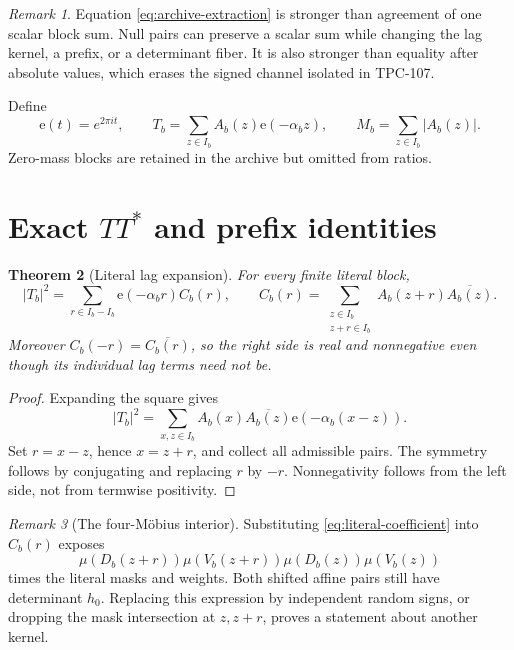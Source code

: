 \documentclass[11pt]{article}
\newtheorem{theorem}{Theorem}[section]
\theoremstyle{definition}
\theoremstyle{remark}
\newtheorem{remark}[theorem]{Remark}
\newcommand{\e}{\mathrm e}
\begin{document}
\begin{remark}
Equation \eqref{eq:archive-extraction} is stronger than agreement of
one scalar block sum.  Null pairs can preserve a scalar sum while
changing the lag kernel, a prefix, or a determinant fiber.  It is
also stronger than equality after absolute values, which erases the
signed channel isolated in TPC-107.
\end{remark}

Define
\[
 \e(t)=e^{2\pi it},\qquad
 T_b=\sum_{z\in I_b}A_b(z)\e(-\alpha_bz),\qquad
 M_b=\sum_{z\in I_b}|A_b(z)|.
\]
Zero-mass blocks are retained in the archive but omitted from ratios.

\section{Exact \texorpdfstring{\(TT^*\)}{TT-star} and prefix identities}

\begin{theorem}[Literal lag expansion]
\label{thm:ttstar}
For every finite literal block,
\begin{equation}
 |T_b|^2
 =
 \sum_{r\in I_b-I_b}\e(-\alpha_br)C_b(r),
 \qquad
 C_b(r)=
 \sum_{\substack{z\in I_b\\z+r\in I_b}}
 A_b(z+r)\overline{A_b(z)}.
 \label{eq:ttstar}
\end{equation}
Moreover \(C_b(-r)=\overline{C_b(r)}\), so the right side is real and
nonnegative even though its individual lag terms need not be.
\end{theorem}

\begin{proof}
Expanding the square gives
\[
 |T_b|^2
 =
 \sum_{x,z\in I_b}
 A_b(x)\overline{A_b(z)}
 \e(-\alpha_b(x-z)).
\]
Set \(r=x-z\), hence \(x=z+r\), and collect all admissible pairs.
The symmetry follows by conjugating and replacing \(r\) by \(-r\).
Nonnegativity follows from the left side, not from termwise
positivity.
\end{proof}

\begin{remark}[The four-M\"obius interior]
Substituting \eqref{eq:literal-coefficient} into \(C_b(r)\) exposes
\[
 \mu(D_b(z+r))\mu(V_b(z+r))
 \mu(D_b(z))\mu(V_b(z))
\]
times the literal masks and weights.  Both shifted affine pairs still
have determinant \(h_0\).  Replacing this expression by independent
random signs, or dropping the mask intersection at \(z,z+r\), proves
a statement about another kernel.
\end{remark}
\end{document}
